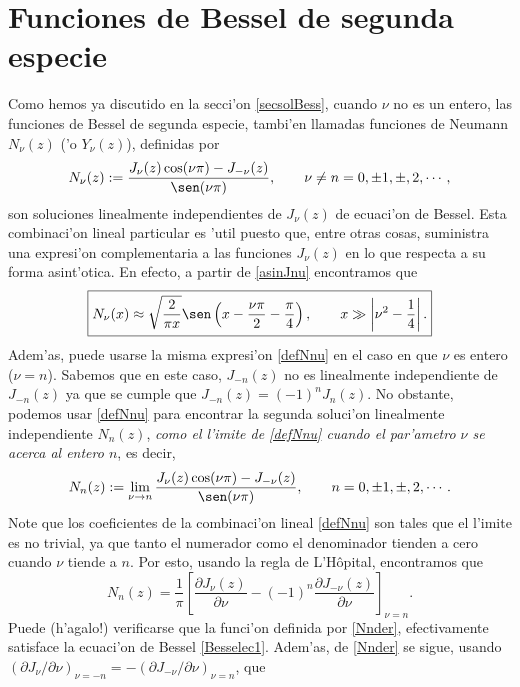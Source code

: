 \section{Funciones de Bessel de segunda especie}\label{sec:FB2E}
Como hemos ya discutido en la secci'on \ref{secsolBess}, cuando $\nu$ no es un entero, las funciones de Bessel de segunda especie, tambi'en llamadas funciones de Neumann $N_\nu(z)$ ('o $Y_\nu(z)$), definidas por
\begin{equation}\label{defNnu}
N_\nu (z):=  \frac{J_\nu(z) \cos(\nu \pi) - J_{-\nu}(z)}{\sen(\nu \pi)} , \qquad \nu\neq n=0, \pm 1, \pm, 2, \cdots,
\end{equation}
son soluciones linealmente independientes de $J_\nu(z)$ de ecuaci'on de Bessel. Esta combinaci'on lineal particular es 'util puesto que, entre otras cosas, suministra una expresi'on complementaria a las funciones $J_\nu(z)$ en lo que respecta a su forma asint'otica. En efecto, a partir de \eqref{asinJnu} encontramos que
\begin{equation}\label{asinNnu}
\boxed{N_\nu(x)\approx \sqrt{\frac{2}{\pi x}}\sen\left(x-\frac{\nu\pi}{2}-\frac{\pi}{4}\right), 
\qquad x\gg\left|\nu^2-\frac{1}{4}\right|.}
\end{equation}
Adem'as, puede usarse la misma expresi'on \eqref{defNnu} en el caso en que $\nu$ es entero ($\nu=n$). Sabemos que en este caso, $J_{-n}(z)$ no es linealmente independiente de $J_{-n}(z)$ ya que se cumple que $J_{-n}(z)=(-1)^nJ_n(z)$. No obstante, podemos usar \eqref{defNnu} para encontrar la segunda soluci'on linealmente independiente $N_n(z)$, \textit{como el l'imite de \eqref{defNnu} cuando el par'ametro $\nu$ se acerca al entero $n$}, es decir,
\begin{equation}\label{Nnlim}
N_n(z):=  \lim_{\nu\to n}\frac{J_\nu(z) \cos(\nu \pi) - J_{-\nu}(z)}{\sen(\nu \pi)} , \qquad n=0, \pm 1, \pm, 2, \cdots .
\end{equation}
Note que los coeficientes de la combinaci'on lineal \eqref{defNnu} son tales que el l'imite es no trivial, ya que tanto el numerador como el denominador tienden a cero cuando $\nu$ tiende a $n$. Por esto, usando la regla de L'H\^opital, encontramos que
\begin{equation}\label{Nnder}
N_n(z)=\frac{1}{\pi}\left[\frac{\partial J_\nu(z)}{\partial\nu}-(-1)^n\frac{\partial J_{-\nu}(z)}{\partial\nu}\right]_{\nu=n}.
\end{equation}
Puede (h'agalo!) verificarse que la funci'on definida por \eqref{Nnder}, efectivamente satisface la ecuaci'on de Bessel \eqref{Besselec1}. Adem'as, de \eqref{Nnder} se sigue, usando $(\partial J_\nu/\partial\nu)_{\nu=-n}=-(\partial J_{-\nu}/\partial\nu)_{\nu=n}$, que
